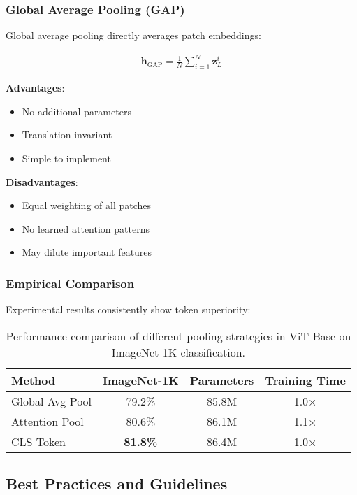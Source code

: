 \subsubsection{Global Average Pooling (GAP)}

Global average pooling directly averages patch embeddings:

\begin{align}
\mathbf{h}_{\text{GAP}} = \frac{1}{N} \sum_{i=1}^{N} \mathbf{z}_L^i
\end{align}

\textbf{Advantages}:
\begin{itemize}
\item No additional parameters
\item Translation invariant
\item Simple to implement
\end{itemize}

\textbf{Disadvantages}:
\begin{itemize}
\item Equal weighting of all patches
\item No learned attention patterns
\item May dilute important features
\end{itemize}

\subsubsection{Empirical Comparison}

Experimental results consistently show \cls{} token superiority:

\begin{table}[htbp]
\centering
\begin{tabular}{lccc}
\toprule
\textbf{Method} & \textbf{ImageNet-1K} & \textbf{Parameters} & \textbf{Training Time} \\
\midrule
Global Avg Pool & 79.2\% & 85.8M & 1.0× \\
Attention Pool & 80.6\% & 86.1M & 1.1× \\
CLS Token & \textbf{81.8\%} & 86.4M & 1.0× \\
\bottomrule
\end{tabular}
\caption{Performance comparison of different pooling strategies in ViT-Base on ImageNet-1K classification.}
\end{table}

\subsection{Best Practices and Guidelines}

